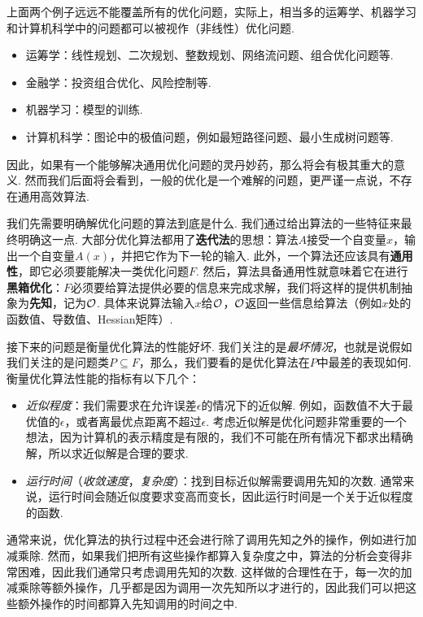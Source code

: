 上面两个例子远远不能覆盖所有的优化问题，实际上，相当多的运筹学、机器学习和计算机科学中的问题都可以被视作（非线性）优化问题. 
\begin{itemize}
    \item 运筹学：线性规划、二次规划、整数规划、网络流问题、组合优化问题等.
    \item 金融学：投资组合优化、风险控制等.
    \item 机器学习：模型的训练.
    \item 计算机科学：图论中的极值问题，例如最短路径问题、最小生成树问题等.
\end{itemize}
因此，如果有一个能够解决通用优化问题的灵丹妙药，那么将会有极其重大的意义. 然而我们后面将会看到，一般的优化是一个难解的问题，更严谨一点说，不存在通用高效算法. 

我们先需要明确解优化问题的算法到底是什么. 我们通过给出算法的一些特征来最终明确这一点. 大部分优化算法都用了\textbf{迭代法}的思想：算法$A$接受一个自变量$x$，输出一个自变量$A(x)$，并把它作为下一轮的输入. 此外，一个算法还应该具有\textbf{通用性}，即它必须要能解决一类优化问题$F$. 然后，算法具备通用性就意味着它在进行\textbf{黑箱优化}：$F$必须要给算法提供必要的信息来完成求解，我们将这样的提供机制抽象为\textbf{先知}，记为$\mathcal{O}$. 具体来说算法输入$x$给$\mathcal{O}$，$\mathcal{O}$返回一些信息给算法（例如$x$处的函数值、导数值、Hessian矩阵）.

接下来的问题是衡量优化算法的性能好坏. 我们关注的是\emph{最坏情况}，也就是说假如我们关注的是问题类$P\subseteq F$，那么，我们要看的是优化算法在$P$中最差的表现如何. 衡量优化算法性能的指标有以下几个：

\begin{itemize}
    \item \emph{近似程度}：我们需要求在允许误差$\epsilon$的情况下的近似解. 例如，函数值不大于最优值的$\epsilon$，或者离最优点距离不超过$\epsilon$. 考虑近似解是优化问题非常重要的一个想法，因为计算机的表示精度是有限的，我们不可能在所有情况下都求出精确解，所以求近似解是合理的要求. 
    \item \emph{运行时间}（\emph{收敛速度}，\emph{复杂度}）：找到目标近似解需要调用先知的次数. 通常来说，运行时间会随近似度要求变高而变长，因此运行时间是一个关于近似程度的函数.
\end{itemize}

\begin{remark}
    通常来说，优化算法的执行过程中还会进行除了调用先知之外的操作，例如进行加减乘除. 然而，如果我们把所有这些操作都算入复杂度之中，算法的分析会变得非常困难，因此我们通常只考虑调用先知的次数. 这样做的合理性在于，每一次的加减乘除等额外操作，几乎都是因为调用一次先知所以才进行的，因此我们可以把这些额外操作的时间都算入先知调用的时间之中. 
\end{remark}

